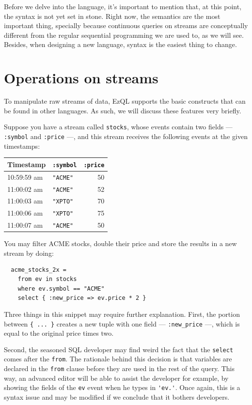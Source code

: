 \documentclass[a4,11pt]{report}
\begin{document}
Before we delve into the language, it's important to mention that, at
this point, the syntax is not yet set in stone. Right now, the
semantics are the most important thing, specially because continuous
queries on streams are conceptually different from the regular
sequential programming we are used to, as we will see. Besides, when
designing a new language, syntax is the easiest thing to change.

\section{Operations on streams}
\label{sec:stream-operations}

To manipulate raw streams of data, EzQL supports the basic constructs
that can be found in other languages. As such, we will discuss these
features very briefly.

Suppose you have a stream called \verb=stocks=, whose events contain
two fields --- \verb=:symbol= and \verb=:price= ---, and this stream
receives the following events at the given timestamps:

\begin{tabular}{ |l|l|r| }
  \hline
  Timestamp & \verb=:symbol= & \verb=:price= \\
  \hline
  10:59:59 am & \verb="ACME"= & 50 \\
  11:00:02 am & \verb="ACME"= & 52 \\
  11:00:03 am & \verb="XPTO"= & 70 \\
  11:00:06 am & \verb="XPTO"= & 75 \\
  11:00:07 am & \verb="ACME"= & 50 \\
  \hline
\end{tabular}

You may filter ACME stocks, double their price and store the results
in a new stream by doing:

\begin{lstlisting}
  acme_stocks_2x =
    from ev in stocks
    where ev.symbol == "ACME"
    select { :new_price => ev.price * 2 }
\end{lstlisting}

Three things in this snippet may require further explanation. First,
the portion between \verb={ ... }= creates a new tuple with one field
--- \verb=:new_price= ---, which is equal to the original price times
two.

Second, the seasoned SQL developer may find weird the fact that the
\verb=select= comes after the \verb=from=. The rationale behind this
decision is that variables are declared in the \verb=from= clause
before they are used in the rest of the query. This way, an advanced
editor will be able to assist the developer for example, by showing
the fields of the \verb=ev= event when he types in \verb='ev.'=. Once
again, this is a syntax issue and may be modified if we conclude that
it bothers developers.
\end{document}
